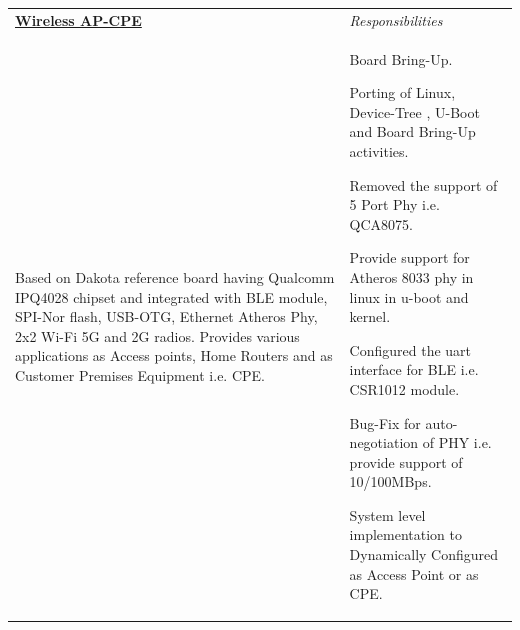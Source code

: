 \begingroup
\setlength{\tabcolsep}{5pt} %
\indent\begin{tabularx}{\textwidth}{p{} p{\RIGHTCOLUMNWIDTH}} %
    \href{https://www.qualcomm.com/products/ipq4028}{\textbf{Wireless AP-CPE }} & \emph{Responsibilities} \\%
    Based on Dakota reference board having Qualcomm IPQ4028 chipset and integrated with BLE module, SPI-Nor flash, USB-OTG, Ethernet Atheros Phy, 2x2 Wi-Fi 5G and 2G radios. Provides various applications as Access points, Home Routers and as Customer Premises Equipment i.e. CPE.
         &
        \vspace{-\topsep}\vspace{2pt} \begin{myitemize}
    \footnotesize {
       \item Board Bring-Up.
	    \item Porting of Linux, Device-Tree , U-Boot and Board Bring-Up activities.
       \item Removed the support of 5 Port Phy i.e. QCA8075.
	    \item Provide support for Atheros 8033 phy in linux in u-boot and kernel.
	    \item Configured the uart interface for BLE i.e. CSR1012 module.
	    \item Bug-Fix for auto-negotiation of PHY i.e. provide support of 10/100MBps.
	    \item System level implementation to Dynamically Configured as Access Point or as CPE. %
    }
   \end{myitemize}\vspace{-\topsep}%
\end{tabularx}
